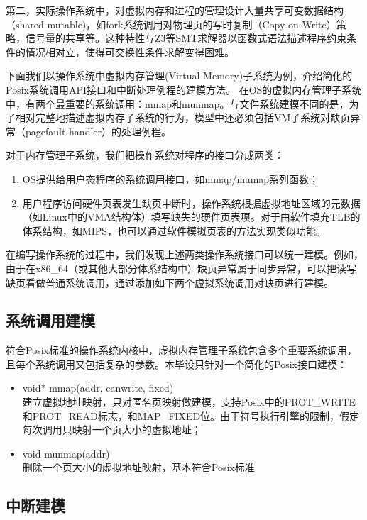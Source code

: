 第二，实际操作系统中，对虚拟内存和进程的管理设计大量共享可变数据结构（shared
mutable)，如fork系统调用对物理页的写时复制（Copy-on-Write）策略，信号量的共享等。这种特性与Z3等SMT求解器以函数式语法描述程序约束条件的情况相对立，使得可交换性条件求解变得困难。

下面我们以操作系统中虚拟内存管理(Virtual Memory)子系统为例，介绍简化的Posix系统调用API接口和中断处理例程的建模方法。
在OS的虚拟内存管理子系统中，有两个最重要的系统调用：mmap和munmap。与文件系统建模不同的是，为了相对完整地描述虚拟内存子系统的行为，模型中还必须包括VM子系统对缺页异常（pagefault
handler）的处理例程。

对于内存管理子系统，我们把操作系统对程序的接口分成两类：
\begin{enumerate}
\item OS提供给用户态程序的系统调用接口，如mmap/mumap系列函数；
\item 用户程序访问硬件页表发生缺页中断时，操作系统根据虚拟地址区域的元数据（如Linux中的VMA结构体）填写缺失的硬件页表项。对于由软件填充TLB的体系结构，如MIPS，也可以通过软件模拟页表的方法实现类似功能。
\end{enumerate}

在编写操作系统的过程中，我们发现上述两类操作系统接口可以统一建模。例如，由于在x86\_64（或其他大部分体系结构中）缺页异常属于同步异常\cite{intelsys}，可以把读写缺页看做普通系统调用，通过添加如下两个虚拟系统调用对缺页进行建模。

\subsection{系统调用建模}
符合Posix标准的操作系统内核中，虚拟内存管理子系统包含多个重要系统调用，且每个系统调用又包括复杂的参数。本毕设只针对一个简化的Posix接口建模：

\begin{itemize}
	\item void* mmap(addr, canwrite, fixed) \\
		建立虚拟地址映射，只对匿名页映射做建模，支持Posix中的PROT\_WRITE和PROT\_READ标志，和MAP\_FIXED位。由于符号执行引擎的限制，假定每次调用只映射一个页大小的虚拟地址；
	\item void munmap(addr) \\
		删除一个页大小的虚拟地址映射，基本符合Posix标准
\end{itemize}

\subsection{中断建模}

